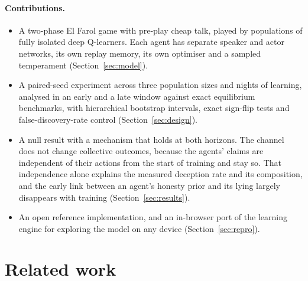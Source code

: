 \documentclass[11pt]{article}
\begin{document}
\paragraph{Contributions.}
\begin{itemize}
  \item A two-phase El Farol game with pre-play cheap talk, played by populations of fully isolated deep Q-learners. Each agent has separate speaker and actor networks, its own replay memory, its own optimiser and a sampled temperament (Section~\ref{sec:model}).
  \item A paired-seed experiment across three population sizes and \rnightsLong{} nights of learning, analysed in an early and a late window against exact equilibrium benchmarks, with hierarchical bootstrap intervals, exact sign-flip tests and false-discovery-rate control (Section~\ref{sec:design}).
  \item A null result with a mechanism that holds at both horizons. The channel does not change collective outcomes, because the agents' claims are independent of their actions from the start of training and stay so. That independence alone explains the measured deception rate and its composition, and the early link between an agent's honesty prior and its lying largely disappears with training (Section~\ref{sec:results}).
  \item An open reference implementation, and an in-browser port of the learning engine for exploring the model on any device (Section~\ref{sec:repro}).
\end{itemize}

\section{Related work}
\end{document}

